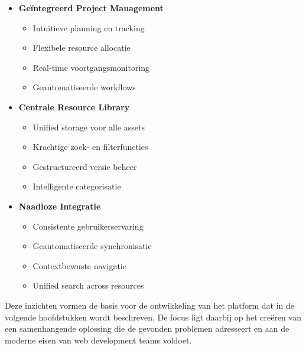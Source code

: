 \begin{itemize}
    \item \textbf{Geïntegreerd Project Management}
    \begin{itemize}
        \item Intuïtieve planning en tracking
        \item Flexibele resource allocatie
        \item Real-time voortgangsmonitoring
        \item Geautomatiseerde workflows
    \end{itemize}
    
    \item \textbf{Centrale Resource Library}
    \begin{itemize}
        \item Unified storage voor alle assets
        \item Krachtige zoek- en filterfuncties
        \item Gestructureerd versie beheer
        \item Intelligente categorisatie
    \end{itemize}
    
    \item \textbf{Naadloze Integratie}
    \begin{itemize}
        \item Consistente gebruikerservaring
        \item Geautomatiseerde synchronisatie
        \item Contextbewuste navigatie
        \item Unified search across resources
    \end{itemize}
\end{itemize}

Deze inzichten vormen de basis voor de ontwikkeling van het platform dat in de volgende hoofdstukken wordt beschreven. De focus ligt daarbij op het creëren van een samenhangende oplossing die de gevonden problemen adresseert en aan de moderne eisen van web development teams voldoet.

